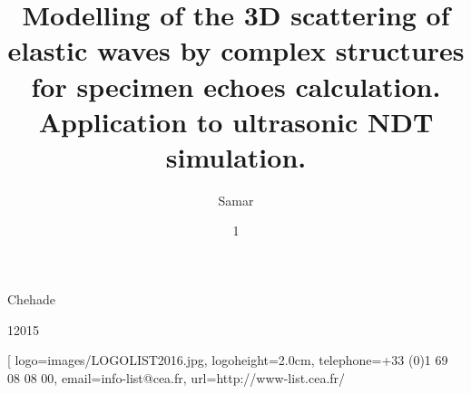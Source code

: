 \author[samar.chehade.sc@gmail.com]{Samar}{Chehade}
%
\title[Modélisation de la diffusion 3D d'ondes élastiques par des structures complexes pour le calcul des échos de géométrie. Application à la simulation des CND par ultrasons.]{Modelling of the 3D scattering of elastic waves by complex structures for specimen echoes calculation. Application to ultrasonic NDT simulation.}
%
%
%
%
\date{1}{1}{2015}
%
%
\subject[Diffraction d'ondes élastiques]{Elastic wave diffraction}
%
%
%
%
%
\laboratory[
logo=images/LOGOLIST2016.jpg,
logoheight=2.0cm,
telephone=+33 (0)1 69 08 08 00,
email=info-list@cea.fr,
url=http://www-list.cea.fr/
